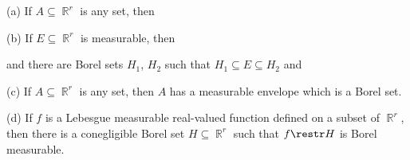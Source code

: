  (a) If $A\subseteq\BbbR^r$ is any set, then
     
     
(b)   If $E\subseteq\BbbR^r$ is measurable, then
     
     
\noindent and there are Borel sets $H_1$, $H_2$ such that 
$H_1\subseteq E\subseteq H_2$ and
     
     
(c) If $A\subseteq\BbbR^r$ is any set, then $A$ has a measurable
envelope which is a Borel set.
     
(d) If $f$ is a Lebesgue measurable real-valued function defined on a
subset of $\BbbR^r$, then there is a conegligible Borel set
$H\subseteq\BbbR^r$ such that $f\restr H$ is Borel measurable.
     
